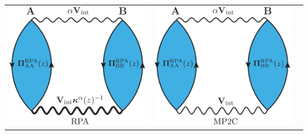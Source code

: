 \documentclass{standalone}
\begin{document}

\begin{tabular}{ccc}
    \includegraphics[scale=0.14]{rpa.eps} 
  & \includegraphics[scale=0.14]{mp2c.eps}

\end{tabular}
\end{document}
